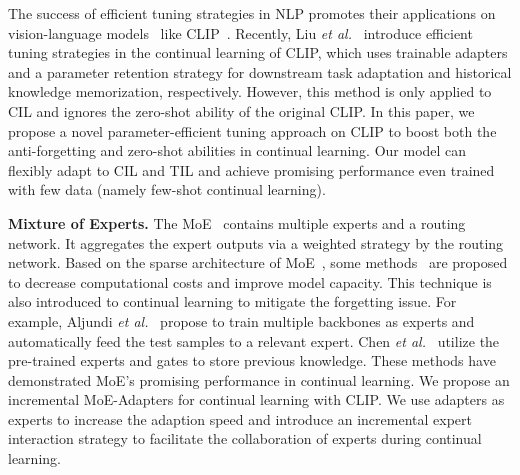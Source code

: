The success of efficient tuning strategies in NLP promotes their applications on vision-language models~\cite{ju2022prompting, zhou2022conditional, gao2023clip, sung2022vl, zhang2021tip} like CLIP~\cite{gao2023clip}.
Recently, Liu \textit{et al.}~\cite{liu2023class} introduce efficient tuning strategies in the continual learning of CLIP, which uses trainable adapters and a parameter retention strategy for downstream task adaptation and historical knowledge memorization, respectively.
However, this method is only applied to CIL and ignores the zero-shot ability of the original CLIP. 
In this paper, we propose a novel parameter-efficient tuning approach on CLIP to boost both the anti-forgetting and zero-shot abilities in continual learning. Our model can flexibly adapt to CIL and TIL and achieve promising performance even trained with few data (namely few-shot continual learning).



\noindent\textbf{Mixture of Experts.}
The MoE~\cite{jacobs1991adaptive} contains multiple experts and a routing network. It aggregates the expert outputs via a weighted strategy by the routing network. Based on the sparse architecture of MoE~\cite{shazeer2017outrageously}, some methods~\cite{riquelme2021scaling, mustafa2022multimodal,fedus2022switch, daxberger2023mobile} are proposed to decrease computational costs and improve model capacity. This technique is also introduced to continual learning to mitigate the forgetting issue. For example, Aljundi \textit{et al.}~\cite{aljundi2017expert} propose to train multiple backbones as experts and automatically feed the test samples to a relevant expert. Chen \textit{et al.}~\cite{chen2023lifelong} utilize the pre-trained experts and gates to store previous knowledge. These methods have demonstrated MoE's promising performance in continual learning.
We propose an incremental MoE-Adapters for continual learning with CLIP. We use adapters as experts to increase the adaption speed and introduce an incremental expert interaction strategy to facilitate the collaboration of experts during continual learning. 






